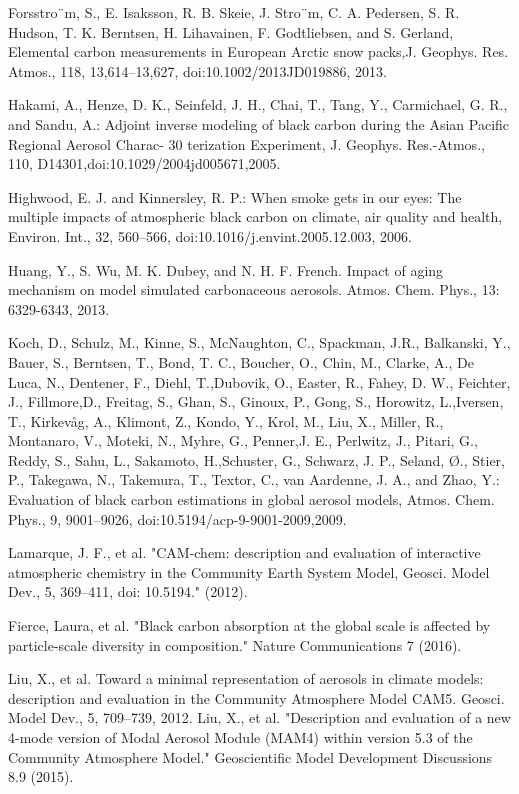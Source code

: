 \documentclass[12pt]{article}
\begin{document}
Forsstro¨m, S., E. Isaksson, R. B. Skeie, J. Stro¨m, C. A. Pedersen, S. R. Hudson, T. K. Berntsen, H. Lihavainen, F. Godtliebsen, and S. Gerland, Elemental carbon measurements in European Arctic snow packs,J. Geophys. Res. Atmos., 118, 13,614–13,627, doi:10.1002/2013JD019886, 2013.

Hakami, A., Henze, D. K., Seinfeld, J. H., Chai, T., Tang, Y., Carmichael, G. R., and Sandu, A.: Adjoint inverse modeling of black carbon during the Asian Pacific Regional Aerosol Charac- 30 terization Experiment, J. Geophys. Res.-Atmos., 110, D14301,doi:10.1029/2004jd005671,2005.

Highwood, E. J. and Kinnersley, R. P.: When smoke gets in our eyes: The multiple impacts of atmospheric black carbon on climate, air quality and health, Environ. Int., 32, 560–566, doi:10.1016/j.envint.2005.12.003, 2006.

Huang, Y., S. Wu, M. K. Dubey, and N. H. F. French.  Impact of aging mechanism on model simulated carbonaceous aerosols. Atmos. Chem. Phys., 13: 6329-6343, 2013.

Koch, D., Schulz, M., Kinne, S., McNaughton, C., Spackman, J.R., Balkanski, Y., Bauer, S., Berntsen, T., Bond, T. C., Boucher, O., Chin, M., Clarke, A., De Luca, N., Dentener, F., Diehl, T.,Dubovik, O., Easter, R., Fahey, D. W., Feichter, J., Fillmore,D., Freitag, S., Ghan, S., Ginoux, P., Gong, S., Horowitz, L.,Iversen, T., Kirkevåg, A., Klimont, Z., Kondo, Y., Krol, M., Liu, X., Miller, R., Montanaro, V., Moteki, N., Myhre, G., Penner,J. E., Perlwitz, J., Pitari, G., Reddy, S., Sahu, L., Sakamoto, H.,Schuster, G., Schwarz, J. P., Seland, Ø., Stier, P., Takegawa, N., Takemura, T., Textor, C., van Aardenne, J. A., and Zhao, Y.: Evaluation of black carbon estimations in global aerosol models, Atmos. Chem. Phys., 9, 9001–9026, doi:10.5194/acp-9-9001-2009,2009.

Lamarque, J. F., et al. "CAM-chem: description and evaluation of interactive atmospheric chemistry in the Community Earth System Model, Geosci. Model Dev., 5, 369–411, doi: 10.5194." (2012).

Fierce, Laura, et al. "Black carbon absorption at the global scale is affected by particle-scale diversity in composition." Nature Communications 7 (2016).

Liu, X., et al. Toward a minimal representation of aerosols in climate models: description and evaluation in the Community Atmosphere Model CAM5. Geosci. Model Dev., 5, 709–739, 2012.
Liu, X., et al. "Description and evaluation of a new 4-mode version of Modal Aerosol Module (MAM4) within version 5.3 of the Community Atmosphere Model." Geoscientific Model Development Discussions 8.9 (2015).
\end{document}
